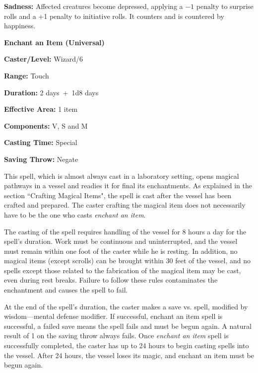 \begin{multicols}{2}
\textbf{Sadness:} Affected creatures become depressed, applying a $-1$ penalty to surprise rolls and a +1 penalty to initiative rolls.  It counters and is countered by happiness.

\vspace{1em}

\noindent
\begin{minipage}{\columnwidth}

\noindent \textbf{Enchant an Item (Universal)}

\noindent \textbf{Caster/Level:} Wizard/6

\noindent \textbf{Range:} Touch

\noindent \textbf{Duration:} 2 days~+~1d8 days

\noindent \textbf{Effective Area:} 1 item

\noindent \textbf{Components:} V, S and M

\noindent \textbf{Casting Time:} Special

\noindent \textbf{Saving Throw:} Negate

\end{minipage}

This spell, which is almost always cast in a laboratory setting, opens magical pathways in a vessel and readies it for final its enchantments.  As explained in the section ``Crafting Magical Items", the spell is cast after the vessel has been crafted and prepared.  The caster crafting the magical item does not necessarily have to be the one who casts \textit{enchant an item}.

The casting of the spell requires handling of the vessel for 8 hours a day for the spell's duration.  Work must be continuous and uninterrupted, and the vessel must remain within one foot of the caster while he is resting.  In addition, no magical items (except scrolls) can be brought within 30 feet of the vessel, and no spells except those related to the fabrication of the magical item may be cast, even during rest breaks.  Failure to follow these rules contaminates the enchantment and causes the spell to fail.  

At the end of the spell's duration, the caster makes a save vs. spell, modified by wisdom---mental defense modifier.  If successful, enchant an item spell is successful, a failed save means the spell fails and must be begun again.  A natural result of 1 on the saving throw always fails.  Once \textit{enchant an item} spell is successfully completed, the caster has up to 24 hours to begin casting spells into the vessel.  After 24 hours, the vessel loses its magic, and enchant an item must be begun again.  


\end{multicols}
